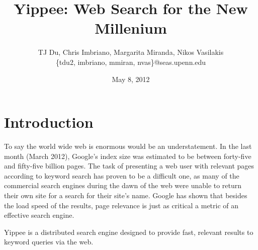 \documentclass[11pt, letterpaper, oneside, twocolumn]{article}
\begin{document}
\title{Yippee: Web Search for the New Millenium}
\author{	TJ Du, Chris Imbriano, Margarita Miranda, Nikos Vasilakis\\
	\{tdu2, imbriano, mmiran, nvas\}@seas.upenn.edu}
\date{May 8, 2012}

\maketitle


\section{ Introduction }

To say the world wide web is enormous would be an understatement.  In the last month (March 2012),  Google's index size was estimated to be between forty-five and fifty-five billion pages.\cite{websize} The task of presenting a web user with relevant pages according to keyword search has proven to be a difficult one, as many of the commercial search engines during the dawn of the web were unable to return their own site for a search for their site's name.\cite{google} Google has shown that besides the load speed of the results, page relevance is just as critical a metric of an effective search engine. 

Yippee is a distributed search engine designed to provide fast, relevant results to keyword queries via the web.  
\end{document}
